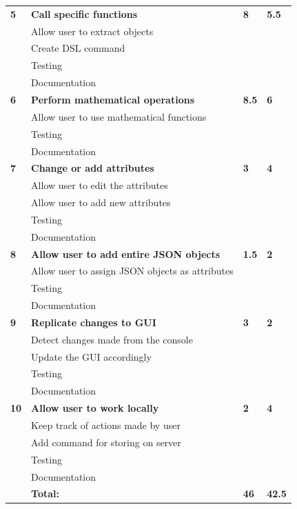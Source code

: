 \begin{table}
\begin{tabular}{ l p{8cm} l l }
 \bf{5}	  &\bf{Call specific functions}					&\bf{8}		&\bf{5.5}		     \\
		  &Allow user to extract objects				&			&		\\
		  &Create DSL command						&			&		\\
		  &Testing								&			&		\\
		  &Documentation							&			&		\\

\bf{6}	  &\bf{Perform mathematical operations}			&\bf{8.5}		&\bf{6}		     \\
		  &Allow user to use mathematical functions		&			&		\\
		  &Testing								&			&		\\
		  &Documentation							&			&		\\

\bf{7}   	&\bf{Change or add attributes}				&\bf{3}		&\bf{4}		     \\ 
		  &Allow user to edit the attributes				&			&		\\
		  &Allow user to add new attributes				&			&		\\
		  &Testing								&			&		\\
		  &Documentation							&			&		\\

\bf{8}   	&\bf{Allow user to add entire JSON objects}			&\bf{1.5}		&\bf{2}		     \\ 
		  &Allow user to assign JSON objects as attributes		&			&		\\
		  &Testing									&			&		\\
		  &Documentation								&			&		\\

\bf{9}   	&\bf{Replicate changes to GUI}				&\bf{3}		&\bf{2}		     \\ 
		  &Detect changes made from the console		&			&		\\
		  &Update the GUI accordingly					&			&		\\
		  &Testing								&			&		\\
		  &Documentation							&			&		\\

\bf{10}   	&\bf{Allow user to work locally}				&\bf{2}		&\bf{4}		     \\ 
		  &Keep track of actions made by user			&			&		\\
		  &Add command for storing on server			&			&		\\
		  &Testing								&			&		\\
		  &Documentation							&			&		\\

\hline 
		  &\bf{Total:}						&\bf{46}		&\bf{42.5}		\\
\hline
\end{tabular}
\label{table:sp3usrstories}
\end{table}




